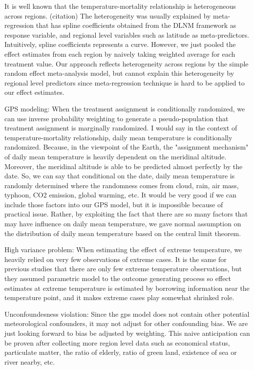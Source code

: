 \documentclass[12pt]{article}
\begin{document}
It is well known that the temperature-mortality relationship is heterogeneous across regions. (citation)
The heterogeneity was usually explained by meta-regression
that has spline coefficients obtained from the DLNM framework as response variable, 
and regional level variables such as latitude as meta-predictors.
Intuitively, spline coefficients represents a curve.
However, we just pooled the effect estimates from each region 
by naively taking weighted average for each treatment value.
Our approach reflects heterogeneity across regions by the simple random effect meta-analysis model, 
but cannot explain this heterogeneity by regional level predictors
since meta-regression technique is hard to be applied to our effect estimates.

GPS modeling:
When the treatment assignment is conditionally randomized, 
we can use inverse probability weighting to generate a pseudo-population
that treatment assignment is marginally randomized.
I would say in the context of temperature-mortality relationship,
daily mean temperature is conditionally randomized.
Because, in the viewpoint of the Earth, 
the "assignment mechanism" of daily mean temperature is heavily dependent on the meridinal altitude.
Moreover, the meridinal altitude is able to be predicted almost perfectly by the date.
So, we can say that conditional on the date, daily mean temperature is randomly determined
where the randomness comes from cloud, rain, air mass, typhoon, CO2 emission, global warming, etc.
It would be very good if we can include those factors into our GPS model,
but it is impossible because of practical issue.
Rather, by exploiting the fact that 
there are so many factors that may have influence on daily mean temperature,
we gave normal assumption on the distribution of daily mean temperature 
based on the central limit theorem.

High variance problem:
When estimating the effect of extreme temperature,
we heavily relied on very few observations of extreme cases.
It is the same for previous studies that there are only few extreme temperature observations,
but they assumed parametric model to the outcome generating process
so effect estimates at extreme temperature is estimated by borrowing information near the temperature point,
and it makes extreme cases play somewhat shrinked role.

Unconfoundesness violation:
Since the gps model does not contain other potential meteorological confounders,
it may not adjust for other confounding bias.
We are just looking forward to bias be adjusted by weighting.
This naive anticipation can be proven after collecting more region level data
such as economical status, particulate matter, the ratio of elderly, 
ratio of green land, existence of sea or river nearby, etc.
\end{document}
